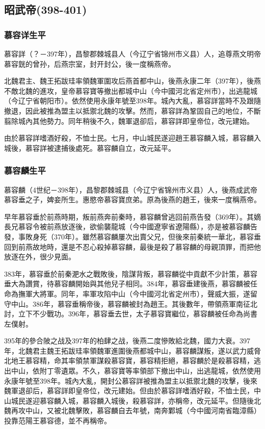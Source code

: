 
\subsection{昭武帝\tiny(398-401)}

\subsubsection{慕容详生平}

慕容詳（？－397年），昌黎郡棘城县人（今辽宁省锦州市义县）人，追尊燕文明帝慕容皝的曾孙，后燕宗室，封开封公，後一度稱燕帝。

北魏君主、魏王拓跋珪率領魏軍圍攻后燕首都中山，後燕永康二年（397年），後燕不敵北魏的進攻，皇帝慕容寶等撤出都城中山（今中國河北省定州市），出逃龍城（今辽宁省朝阳市）。依然使用永康年號至398年。城內大亂，慕容詳當時不及跟隨撤退，因此被推為盟主以抵禦北魏的攻擊。然而，慕容詳為鞏固自己的地位，不斷翦除城內其他勢力。同年稍後不久，魏軍退卻后，慕容詳即皇帝位，改元建始。

由於慕容詳嗜酒好殺，不恤士民。七月，中山城民遂迎趙王慕容麟入城，慕容麟入城後，慕容詳被逮捕後處死。慕容麟自立，改元延平。

\subsubsection{慕容麟生平}

慕容麟（4世纪－398年），昌黎郡棘城县（今辽宁省锦州市义县）人，後燕成武帝慕容垂之子，婢妾所生。惠愍帝慕容寶庶弟。原為後燕的趙王，後來一度稱燕帝。

早年慕容垂於前燕時期，叛前燕奔前秦時，慕容麟曾逃回前燕告發（369年）。其嫡長兄慕容令被前燕放逐後，欲偷襲龍城（今中國遼寧省遼陽縣），亦是被慕容麟告發，事敗身死（370年）。雖然慕容麟屢次出賣父兄，但後來前秦統一華北，慕容垂回到前燕故地時，還是不忍心殺掉慕容麟，最後是殺了慕容麟的母親頂罪，而把他放逐在外，很少見面。

383年，慕容垂於前秦淝水之戰敗後，陰謀背叛，慕容麟從中貢獻不少計策，慕容垂大為讚賞，待慕容麟開始與其他兒子相同。384年，慕容垂建後燕，慕容麟被任命為撫軍大將軍。同年，率軍攻陷中山（今中國河北省定州市），聲威大振，遂留守中山。386年，慕容垂稱帝後，慕容麟被封為趙王。其後數年，帶領燕軍南征北討，立下不少戰功。396年，慕容垂去世，太子慕容寶繼位，慕容麟被任命為尚書左僕射。

395年的參合陂之战及397年的柏肆之战，後燕二度慘敗給北魏，國力大衰。397年，北魏君主魏王拓跋珪率領魏軍進圍後燕都城中山，慕容麟謀叛，遂以武力威脅北地王慕容精，命其率領禁軍謀殺慕容寶，慕容精拒絕，慕容麟於是殺慕容精，逃出中山，依附丁零遺眾。不久，慕容寶等率領部下撤出中山，出逃龍城，依然使用永康年號至398年。城內大亂，開封公慕容詳被推為盟主以抵禦北魏的攻擊，後來魏軍退卻后，慕容詳即皇帝位，改元建始。但由於慕容詳嗜酒好殺，不恤士民，中山城民遂迎慕容麟入城，慕容麟入城後，殺慕容詳，亦稱帝，改元延平。但隨後北魏再攻中山，又被北魏擊敗，慕容麟自去年號，南奔鄴城（今中國河南省臨漳縣）投靠范陽王慕容德，並不再稱帝。

